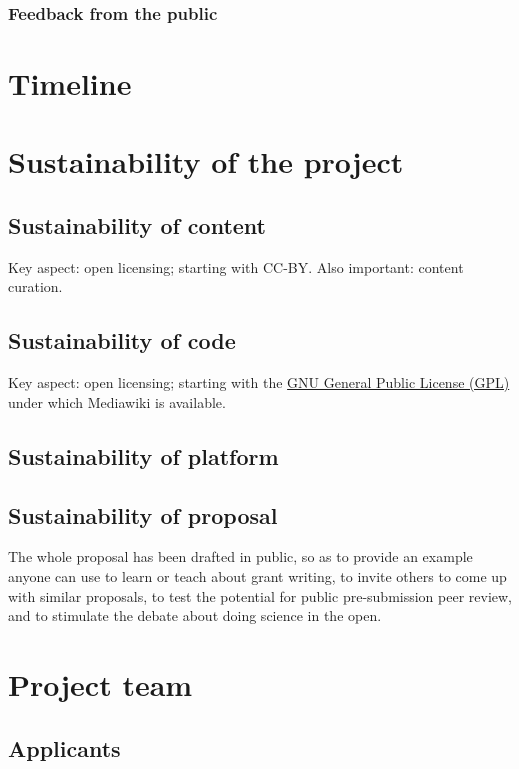 \documentclass[final,authoryear,3p]{elsarticle-open-drafting}
\begin{document}
\subsubsection{Feedback from the public}

\section{Timeline}

\section{Sustainability of the project}
\subsection{Sustainability of content}
Key aspect: open licensing; starting with CC-BY.
Also important: content curation.

\subsection{Sustainability of code}
Key aspect: open licensing; starting with the \href{http://www.gnu.org/licenses/gpl.html}{GNU General Public License (GPL)} under which Mediawiki is available.

\subsection{Sustainability of platform}
\subsection{Sustainability of proposal}
The whole proposal has been drafted in public, so as to provide an example anyone can use 
to learn or teach about grant writing, to invite others to come up with similar proposals, to test the potential for public pre-submission peer review, and to stimulate the debate about doing science in the open.

\section{Project team}
\subsection{Applicants}
\end{document}
